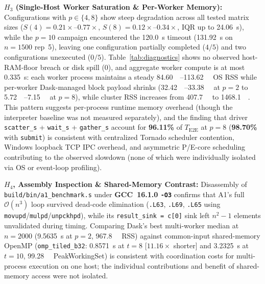 \documentclass[11pt,a4paper]{article}
\begin{document}
\noindent\textbf{$H_3$ (Single-Host Worker Saturation \& Per-Worker Memory):} Configurations with $p \in \{4, 8\}$ show steep degradation across all tested matrix sizes ($S(4)=0.21{\times}\text{--}0.77{\times}$, $S(8)=0.12{\times}\text{--}0.34{\times}$, $\text{IQR}$ up to \SI{24.06}{\second}), while the $p=10$ campaign encountered the \SI{120.0}{\second} timeout (\SI{131.92}{\second} on $n=1500$ rep~5), leaving one configuration partially completed ($4/5$) and two configurations unexecuted ($0/5$). Table~\ref{tab:diagnostics} shows no observed host-RAM-floor breach or disk spill (\SI{0}{\byte}), and aggregate worker compute is at most \SI{0.335}{\second}: each worker process maintains a steady \SIrange{84.60}{113.62}{\mebi\byte} OS RSS while per-worker Dask-managed block payload shrinks (\SIrange{32.42}{33.38}{\mebi\byte} at $p=2$ to \SIrange{5.72}{7.15}{\mebi\byte} at $p=8$), while cluster RSS increases from \SI{407.7}{\mebi\byte} to \SI{1468.1}{\mebi\byte}. This pattern suggests per-process runtime memory overhead (though the interpreter baseline was not measured separately), and the finding that driver \texttt{scatter\_s} + \texttt{wait\_s} + \texttt{gather\_s} account for \textbf{96.11\%} of $T_{\text{E2E}}$ at $p=8$ (\textbf{98.70\%} with \texttt{submit}) is consistent with centralized Tornado scheduler contention, Windows loopback TCP IPC overhead, and asymmetric P/E-core scheduling contributing to the observed slowdown (none of which were individually isolated via OS or event-loop profiling).

\noindent\textbf{$H_4$, Assembly Inspection \& Shared-Memory Contrast:} Disassembly of \nolinkurl{build/bin/a1_benchmark.s} under \textbf{GCC~16.1.0 \texttt{-O3}} confirms that A1's full $\mathcal{O}(n^3)$ loop survived dead-code elimination (\texttt{.L63}, \texttt{.L69}, \texttt{.L65} using \texttt{movupd}/\texttt{mulpd}/\texttt{unpckhpd}), while its \texttt{result\_sink = c[0]} sink left $n^2-1$ elements unvalidated during timing. Comparing Dask's best multi-worker median at $n=2000$ (\SI{9.5635}{\second} at $p=2$, \SI{967.8}{\mebi\byte} RSS) against common-input shared-memory OpenMP (\texttt{omp\_tiled\_b32}: \SI{0.8571}{\second} at $t=8$ [$11.16\times$ shorter] and \SI{3.2325}{\second} at $t=10$, \SI{99.28}{\mebi\byte} PeakWorkingSet) is consistent with coordination costs for multi-process execution on one host; the individual contributions and benefit of shared-memory access were not isolated.
\end{document}
